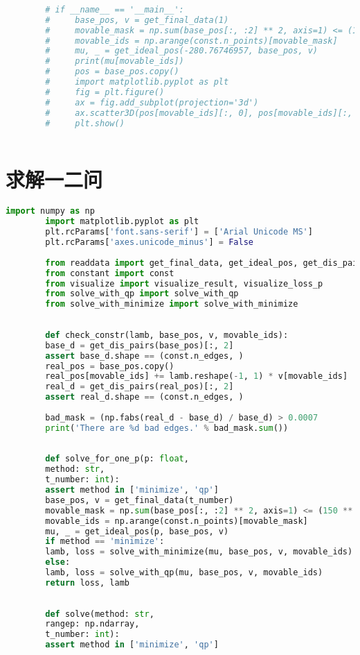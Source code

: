 \documentclass[withoutpreface,bwprint,fontset=macnew]{cumcmthesis} %
\begin{document}
\begin{appendices}
\begin{lstlisting}[language=python]
		
		# if __name__ == '__main__':
		#     base_pos, v = get_final_data(1)
		#     movable_mask = np.sum(base_pos[:, :2] ** 2, axis=1) <= (150 ** 2)
		#     movable_ids = np.arange(const.n_points)[movable_mask]
		#     mu, _ = get_ideal_pos(-280.76746957, base_pos, v)
		#     print(mu[movable_ids])
		#     pos = base_pos.copy()
		#     import matplotlib.pyplot as plt
		#     fig = plt.figure()
		#     ax = fig.add_subplot(projection='3d')
		#     ax.scatter3D(pos[movable_ids][:, 0], pos[movable_ids][:, 1], mu[movable_ids], s=4)
		#     plt.show()
		
	\end{lstlisting}
	
	\section{求解一二问}
	
	\begin{lstlisting}[language=python]
		import numpy as np
		import matplotlib.pyplot as plt
		plt.rcParams['font.sans-serif'] = ['Arial Unicode MS']
		plt.rcParams['axes.unicode_minus'] = False
		
		from readdata import get_final_data, get_ideal_pos, get_dis_pairs, get_layers
		from constant import const
		from visualize import visualize_result, visualize_loss_p
		from solve_with_qp import solve_with_qp
		from solve_with_minimize import solve_with_minimize
		
		
		def check_constr(lamb, base_pos, v, movable_ids):
		base_d = get_dis_pairs(base_pos)[:, 2]
		assert base_d.shape == (const.n_edges, )
		real_pos = base_pos.copy()
		real_pos[movable_ids] += lamb.reshape(-1, 1) * v[movable_ids]
		real_d = get_dis_pairs(real_pos)[:, 2]
		assert real_d.shape == (const.n_edges, )
		
		bad_mask = (np.fabs(real_d - base_d) / base_d) > 0.0007
		print('There are %d bad edges.' % bad_mask.sum())
		
		
		def solve_for_one_p(p: float,
		method: str,
		t_number: int):
		assert method in ['minimize', 'qp']
		base_pos, v = get_final_data(t_number)
		movable_mask = np.sum(base_pos[:, :2] ** 2, axis=1) <= (150 ** 2)
		movable_ids = np.arange(const.n_points)[movable_mask]
		mu, _ = get_ideal_pos(p, base_pos, v)
		if method == 'minimize':
		lamb, loss = solve_with_minimize(mu, base_pos, v, movable_ids)
		else:
		lamb, loss = solve_with_qp(mu, base_pos, v, movable_ids)
		return loss, lamb
		
		
		def solve(method: str,
		rangep: np.ndarray,
		t_number: int):
		assert method in ['minimize', 'qp']
		

\end{lstlisting}
\end{appendices}
\end{document}
